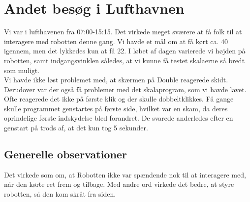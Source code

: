 \section{Andet besøg i Lufthavnen}
\label{TestAfSkalaLufthavnsBesog}
%
Vi var i lufthavenen fra 07:00-15:15. Det virkede meget sværere at få folk til at interagere med robotten denne gang. Vi havde et mål om at få kørt ca. 40 igennem, men det lykkedes kun at få 22. I løbet af dagen varierede vi højden på robotten, samt indgangsvinklen således, at vi kunne få testet skalaerne så bredt som muligt.\\
Vi havde ikke løst problemet med, at skærmen på Double reagerede skidt. Derudover var der også få problemer med det skalaprogram, som vi havde lavet. Ofte reagerede det ikke på første klik og der skulle dobbeltklikkes. Få gange skulle programmet genstartes på første side, hvilket var en skam, da deres oprindelige første indskydelse bled forandret. De svarede anderledes efter en genstart på trods af, at det kun tog 5 sekunder.

\subsection{Generelle observationer}
Det virkede som om, at Robotten ikke var spændende nok til at interagere med, når den kørte ret frem og tilbage. Med andre ord virkede det bedre, at styre robotten, så den kom skråt fra siden. 